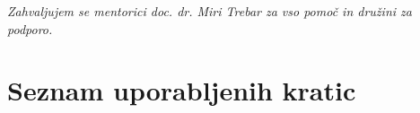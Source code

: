 \vfill



\vspace{2cm}


\clearemptydoublepage

\thispagestyle{empty}\mbox{}\vfill\null\it%
\noindent
Zahvaljujem se mentorici doc. dr. Miri Trebar za vso pomoč in družini za podporo.
\rm\normalfont

\clearemptydoublepage




\pagestyle{empty}
\def\thepage{}%
\tableofcontents{}


\clearemptydoublepage


\chapter*{Seznam uporabljenih kratic}  %


